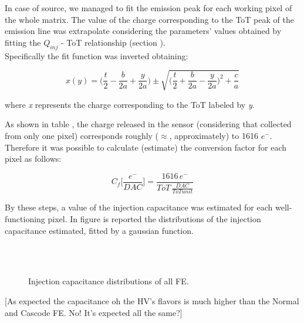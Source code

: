 In case of  source, we managed to fit the emission peak for each working pixel of the whole matrix. The value of the charge corresponding to the ToT peak of the emission line was extrapolate considering the parameters' values obtained by fitting the $Q_{inj}$ - ToT relationship (section ). \\

Specifically the fit function  was inverted obtaining:

\begin{equation}
x(y) = \bigg(\frac{t}{2} - \frac{b}{2a} + \frac{y}{2a}\bigg) \pm \sqrt{\bigg(\frac{t}{2} + \frac{b}{2a} - \frac{y}{2a}\bigg)^{2} + \frac{c}{a}}
\end{equation}

where \textit{x} represents the charge corresponding to the ToT labeled by \textit{y}.

As shown in table , the charge released in the sensor (considering that collected from only one pixel) corresponds roughly ($\approx$, approximately) to 1616 $e^{-}$. Therefore it was possible to calculate (estimate) the conversion factor for each pixel as follows:

\begin{equation}
C_{f}\bigg[\frac{e^{-}}{DAC}\bigg] = \frac{1616 \, e^{-}}{ToT \, \frac{DAC}{ToT unit}}
\label{inj_cap}
\end{equation} 

By these steps, a value of the injection capacitance was estimated for each well-functioning pixel. In figure  is reported the distributions of the injection capacitance estimated, fitted by a gaussian function.

\begin{figure}
\centering
{}\quad
{}\\
\quad
{}\\
\caption{Injection capacitance distributions of all FE.}
\label{fig:cap_dist}
\end{figure} 


[As expected the capacitance oh the HV's flavors is much higher than the Normal and Cascode FE. No! It's expected all the same?] 

